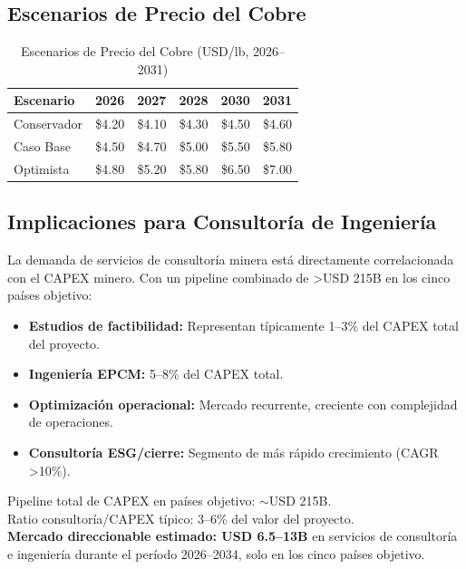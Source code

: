 \subsection{Escenarios de Precio del Cobre}

\begin{table}[htbp]
\centering
\caption{Escenarios de Precio del Cobre (USD/lb, 2026--2031)}
\begin{tabular}{@{}lrrrrr@{}}
\toprule
\textbf{Escenario} & \textbf{2026} & \textbf{2027} & \textbf{2028} & \textbf{2030} & \textbf{2031} \\
\midrule
Conservador & \$4.20 & \$4.10 & \$4.30 & \$4.50 & \$4.60 \\
\rowcolor{tablealt} Caso Base & \$4.50 & \$4.70 & \$5.00 & \$5.50 & \$5.80 \\
Optimista & \$4.80 & \$5.20 & \$5.80 & \$6.50 & \$7.00 \\
\bottomrule
\end{tabular}
\label{tab:copper_scenarios}
\end{table}

\subsection{Implicaciones para Consultoría de Ingeniería}

La demanda de servicios de consultoría minera está directamente correlacionada con el CAPEX minero. Con un pipeline combinado de >USD 215B en los cinco países objetivo:

\begin{itemize}
    \item \textbf{Estudios de factibilidad:} Representan típicamente 1--3\% del CAPEX total del proyecto.
    \item \textbf{Ingeniería EPCM:} 5--8\% del CAPEX total.
    \item \textbf{Optimización operacional:} Mercado recurrente, creciente con complejidad de operaciones.
    \item \textbf{Consultoría ESG/cierre:} Segmento de más rápido crecimiento (CAGR >10\%).
\end{itemize}

\begin{opportunitybox}
Pipeline total de CAPEX en países objetivo: $\sim$USD 215B. \\
Ratio consultoría/CAPEX típico: 3--6\% del valor del proyecto. \\
\textbf{Mercado direccionable estimado: USD 6.5--13B} en servicios de consultoría e ingeniería durante el período 2026--2034, solo en los cinco países objetivo.
\end{opportunitybox}
